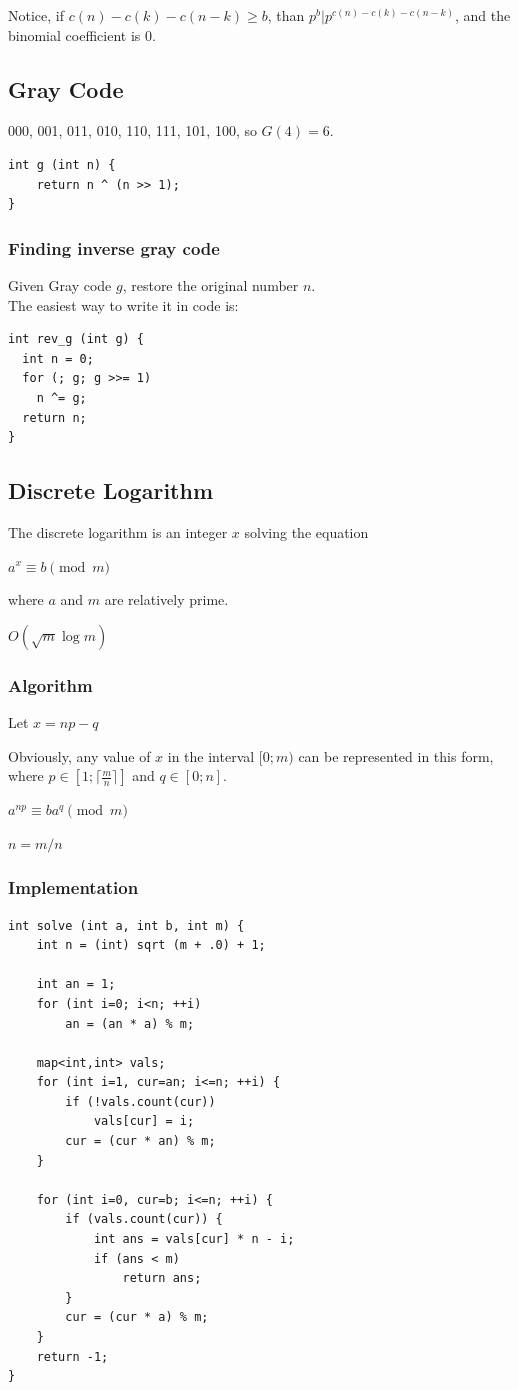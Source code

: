 \documentclass[8pt, a4paper, oneside, twocolumn]{extarticle}
\begin{document}
Notice, if $c(n) - c(k) - c(n-k) \ge b$, than $p^b | p^{c(n) - c(k) - c(n-k)}$, and the binomial coefficient is $0$.
\subsection{Gray Code}
000, 001, 011, 010, 110, 111, 101, 100, so $G(4) = 6$.
\begin{verbatim}
int g (int n) {
    return n ^ (n >> 1);
}
\end{verbatim}
\subsubsection{Finding inverse gray code}
Given Gray code $g$, restore the original number $n$.
\\The easiest way to write it in code is:
\begin{verbatim}
int rev_g (int g) {
  int n = 0;
  for (; g; g >>= 1)
    n ^= g;
  return n;
}
\end{verbatim}
\subsection{Discrete Logarithm}
The discrete logarithm is an integer $x$ solving the equation

$a^x \equiv b \pmod m$

where $a$ and $m$ are relatively prime. 

$O(\sqrt{m} \log m)$
\subsubsection{Algorithm}
Let $x = np - q$

Obviously, any value of $x$ in the interval $[0; m)$ can be represented in this form, where $p \in [1; \lceil \frac{m}{n} \rceil ]$ and $q \in [0; n]$.

$a^{np} \equiv ba^q \pmod m$


$n = m/n$
\subsubsection{Implementation}
\begin{verbatim}
int solve (int a, int b, int m) {
	int n = (int) sqrt (m + .0) + 1;
 
	int an = 1;
	for (int i=0; i<n; ++i)
		an = (an * a) % m;
 
	map<int,int> vals;
	for (int i=1, cur=an; i<=n; ++i) {
		if (!vals.count(cur))
			vals[cur] = i;
		cur = (cur * an) % m;
	}
 
	for (int i=0, cur=b; i<=n; ++i) {
		if (vals.count(cur)) {
			int ans = vals[cur] * n - i;
			if (ans < m)
				return ans;
		}
		cur = (cur * a) % m;
	}
	return -1;
}
\end{verbatim}
\end{document}
